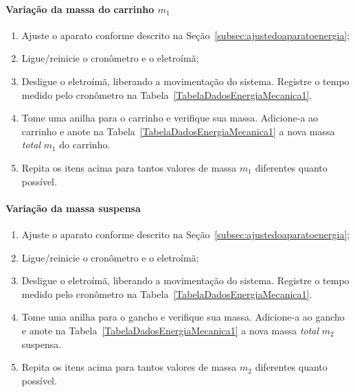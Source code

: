 \paragraph{Variação da massa do carrinho $m_1$}
\begin{enumerate}
    \item Ajuste o aparato conforme descrito na Seção~\ref{subsec:ajustedoaparatoenergia};
    	\item Ligue/reinicie o cronômetro e o eletroímã;
	\item Desligue o eletroímã, liberando a movimentação do sistema. Registre o tempo medido pelo cronômetro na Tabela~\ref{TabelaDadosEnergiaMecanica1}.
	\item Tome uma anilha para o carrinho e verifique sua massa. Adicione-a ao carrinho e anote na Tabela~\ref{TabelaDadosEnergiaMecanica1} a nova massa \emph{total} $m_1$ do carrinho.
	\item Repita os itens acima para tantos valores de massa $m_1$ diferentes quanto possível.
\end{enumerate}

\paragraph{Variação da massa suspensa}
\begin{enumerate}
    \item Ajuste o aparato conforme descrito na Seção~\ref{subsec:ajustedoaparatoenergia};
    	\item Ligue/reinicie o cronômetro e o eletroímã;
	\item Desligue o eletroímã, liberando a movimentação do sistema. Registre o tempo medido pelo cronômetro na Tabela~\ref{TabelaDadosEnergiaMecanica1}.
	\item Tome uma anilha para o gancho e verifique sua massa. Adicione-a ao gancho e anote na Tabela~\ref{TabelaDadosEnergiaMecanica1} a nova massa \emph{total} $m_2$ suspensa.
	\item Repita os itens acima para tantos valores de massa $m_2$ diferentes quanto possível.
\end{enumerate}

